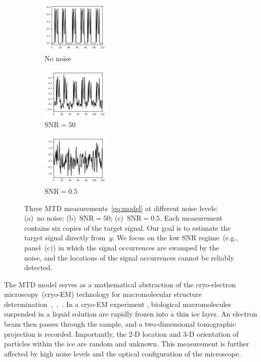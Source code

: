 \documentclass{article}
\newcommand{\rev}[1]{{\color{magenta}{#1}}}
\begin{document}
\begin{figure}[!tb]
	\begin{subfigure}[ht]{0.33\textwidth}
		\centering
		\includegraphics[width=\columnwidth, height=70pt]{figures/y_clean.pdf}
		\caption{No noise}
	\end{subfigure}
	\hfill
	\begin{subfigure}[ht]{0.33\textwidth}
		\centering
		\includegraphics[width=\columnwidth, height=70pt]{figures/y_SNR50.pdf}
		\caption{$\text{SNR} = 50$}
	\end{subfigure}
	\hfill
	\begin{subfigure}[ht]{0.33\textwidth}
		\centering
		\includegraphics[width=\columnwidth, height=70pt]{figures/y_SNR01.pdf}
		\caption{$\text{SNR} = 0.5$}
	\end{subfigure}
	\caption{Three MTD measurements~\eqref{eq:model} \rev{of length~\mbox{$N = 120$}} at different noise levels: (a)~no noise; (b)~\mbox{$\text{SNR} = 50$}; (c)~\mbox{$\text{SNR} = 0.5$}. Each measurement contains six copies of the target signal. Our goal is to estimate the target signal directly from~$y$. We focus on the low SNR regime~(e.g., panel~(c)) in which the signal occurrences are swamped by the noise, and the locations of the signal occurrences cannot be reliably detected.}
\label{fig:measurements}
\end{figure}

The MTD model serves as a mathematical abstraction of the cryo-electron microscopy~(\mbox{cryo-EM}) technology for macromolecular structure determination~\cite{henderson1995potential},~\cite{nogales2016development},~\cite{bai2015cryo}. In a \mbox{cryo-EM} experiment \cite{frank2006three}, biological macromolecules suspended in a liquid solution are rapidly frozen into a thin ice layer. An electron beam then passes through the sample, and a two-dimensional tomographic projection is recorded. Importantly, the \mbox{2-D} location and \mbox{3-D} orientation of particles within the ice are random and unknown. This measurement is further affected by high noise levels and the optical configuration of the microscope.
\end{document}
